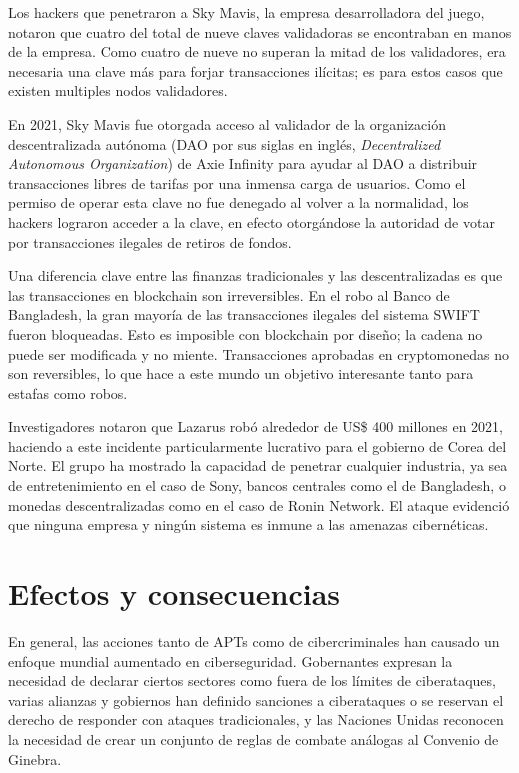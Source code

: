 \documentclass{article}
\begin{document}
Los hackers que penetraron a Sky Mavis, la empresa desarrolladora del juego, notaron que cuatro del total de nueve claves validadoras se encontraban en manos de la empresa. Como cuatro de nueve no superan la mitad de los validadores, era necesaria una clave más para forjar transacciones ilícitas; es para estos casos que existen multiples nodos validadores. 

En 2021, Sky Mavis fue otorgada acceso al validador de la organización descentralizada autónoma (DAO por sus siglas en inglés, {\it Decentralized Autonomous Organization}) de Axie Infinity para ayudar al DAO a distribuir transacciones libres de tarifas por una inmensa carga de usuarios. Como el permiso de operar esta clave no fue denegado al volver a la normalidad, los hackers lograron acceder a la clave, en efecto otorgándose la autoridad de votar por transacciones ilegales de retiros de fondos. \autocite{ronin-axie}

Una diferencia clave entre las finanzas tradicionales y las descentralizadas es que las transacciones en blockchain son irreversibles. En el robo al Banco de Bangladesh, la gran mayoría de las transacciones ilegales del sistema SWIFT fueron bloqueadas. Esto es imposible con blockchain por diseño; la cadena no puede ser modificada y no miente. Transacciones aprobadas en cryptomonedas no son reversibles, lo que hace a este mundo un objetivo interesante tanto para estafas como robos. \autocite{chainsec-axie}

Investigadores notaron que Lazarus robó alrededor de US\$ 400 millones en 2021, haciendo a este incidente particularmente lucrativo para el gobierno de Corea del Norte. El grupo ha mostrado la capacidad de penetrar cualquier industria, ya sea de entretenimiento en el caso de Sony, bancos centrales como el de Bangladesh, o monedas descentralizadas como en el caso de Ronin Network. El ataque evidenció que ninguna empresa y ningún sistema es inmune a las amenazas cibernéticas. \autocite{washingtonpost-axie}

\section{Efectos y consecuencias}
En general, las acciones tanto de APTs como de cibercriminales han causado un enfoque mundial aumentado en ciberseguridad. Gobernantes expresan la necesidad de declarar ciertos sectores como fuera de los límites de ciberataques, varias alianzas y gobiernos han definido sanciones a ciberataques o se reservan el derecho de responder con ataques tradicionales, y las Naciones Unidas reconocen la necesidad de crear un conjunto de reglas de combate análogas al Convenio de Ginebra. \autocite{cfr-regulations}
\end{document}
